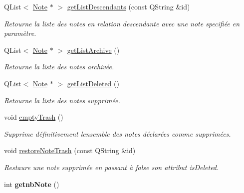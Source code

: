 \begin{DoxyCompactItemize}
Q\+List$<$ \hyperlink{class_note}{Note} $\ast$ $>$ \hyperlink{class_notes_manager_a2ed035544b433b9cddfc83fb4c081a65}{get\+List\+Descendants} (const Q\+String \&id)
\begin{DoxyCompactList}\small\item\em Retourne la liste des notes en relation descendante avec une note specifiée en paramètre. \end{DoxyCompactList}\item 
\mbox{\label{class_notes_manager_a81aee1d57c39232f870199acb356fc57}} 
Q\+List$<$ \hyperlink{class_note}{Note} $\ast$ $>$ \hyperlink{class_notes_manager_a81aee1d57c39232f870199acb356fc57}{get\+List\+Archive} ()
\begin{DoxyCompactList}\small\item\em Retourne la liste des notes archivée. \end{DoxyCompactList}\item 
\mbox{\label{class_notes_manager_ae6b144ba1bc14b895be36b194a2e768e}} 
Q\+List$<$ \hyperlink{class_note}{Note} $\ast$ $>$ \hyperlink{class_notes_manager_ae6b144ba1bc14b895be36b194a2e768e}{get\+List\+Deleted} ()
\begin{DoxyCompactList}\small\item\em Retourne la liste des notes supprimée. \end{DoxyCompactList}\item 
void \hyperlink{class_notes_manager_a84e962ad7fa999cbb687fb43c1b3bab4}{empty\+Trash} ()
\begin{DoxyCompactList}\small\item\em Supprime définitivement l\textquotesingle{}ensemble des notes déclarées comme supprimées. \end{DoxyCompactList}\item 
void \hyperlink{class_notes_manager_abc6587a5d3986ae674e5dd4b9044f348}{restore\+Note\+Trash} (const Q\+String \&id)
\begin{DoxyCompactList}\small\item\em Restaure une note supprimée en passant à false son attribut is\+Deleted. \end{DoxyCompactList}\item 
\mbox{\label{class_notes_manager_a9cab39a524fd23c6523f895e81f75028}} 
int {\bfseries getnb\+Note} ()
\item 
\mbox{\label{class_notes_manager_a4907351a20cc85b1fe0327ac1b15c7da}} 

\end{DoxyCompactItemize}
